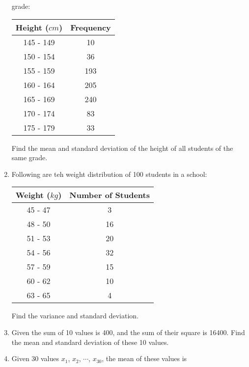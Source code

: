 \documentclass{report}
\begin{document}
\begin{multicols}{2}
\begin{enumerate}
          grade:
          \begin{center}
            \begin{tabular}{|c|c|}
              \hline
              Height ($cm$) & Frequency \\
              \hline
              145 - 149     & 10        \\
              150 - 154     & 36        \\
              155 - 159     & 193       \\
              160 - 164     & 205       \\
              165 - 169     & 240       \\
              170 - 174     & 83        \\
              175 - 179     & 33        \\
              \hline
            \end{tabular}
          \end{center}
          Find the mean and standard deviation of the height of all students of the same grade.
    \item Following are teh weight distribution of 100 students in a school:
          \begin{center}
            \begin{tabular}{|c|c|}
              \hline
              Weight ($kg$) & Number of Students \\
              \hline
              45 - 47       & 3                  \\
              48 - 50       & 16                 \\
              51 - 53       & 20                 \\
              54 - 56       & 32                 \\
              57 - 59       & 15                 \\
              60 - 62       & 10                 \\
              63 - 65       & 4                  \\
              \hline
            \end{tabular}
          \end{center}
          Find the variance and standard deviation.
    \item Given the sum of 10 values is 400, and the sum of their square is 16400. Find
          the mean and standard deviation of these 10 values.
    \item Given 30 values $x_1$, $x_2$, $\cdots$, $x_{30}$, the mean of these values is

\end{enumerate}
\end{multicols}
\end{document}

